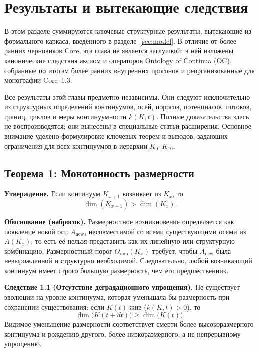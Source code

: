 \section{Результаты и вытекающие следствия}
\label{sec:results}

В этом разделе суммируются ключевые структурные результаты, вытекающие из формального каркаса, введённого в разделе~\ref{sec:model}.
В отличие от более ранних черновиков Core, эта глава не является заглушкой: в ней изложены канонические следствия аксиом и операторов Ontology of Continua (OC), собранные по итогам более ранних внутренних прогонов и реорганизованные для монографии Core~1.3.

Все результаты этой главы предметно-независимы.
Они следуют исключительно из структурных определений континуумов, осей, порогов, потенциалов, потоков, границ, циклов и меры континуумности \(k(K,t)\).
Полные доказательства здесь не воспроизводятся; они вынесены в специальные статьи-расширения.
Основное внимание уделено формулировке ключевых теорем и выводов, задающих ограничения для всех континуумов в иерархии \(K_0\)–\(K_{10}\).

\subsection{Теорема 1: Монотонность размерности}

\textbf{Утверждение.}
Если континуум \(K_{x+1}\) возникает из \(K_x\), то
\[
    \dim(K_{x+1}) > \dim(K_x).
\]

\textbf{Обоснование (набросок).}
Размерностное возникновение определяется как появление новой оси \(A_{\mathrm{new}}\), несовместимой со всеми существующими осями из \(A(K_x)\); то есть её нельзя представить как их линейную или структурную комбинацию.
Размерностный порог \(\Theta_{\mathrm{dim}}(K_x)\) требует, чтобы \(A_{\mathrm{new}}\) была невырожденной и структурно необходимой.
Следовательно, любой возникающий континуум имеет строго большую размерность, чем его предшественник.

\textbf{Следствие 1.1 (Отсутствие деградационного упрощения).}
Не существует эволюции на уровне континуума, которая уменьшала бы размерность при сохранении существования:
если \(K(t)\) жив (\(k(K,t) > 0\)), то
\[
    \dim\big(K(t+dt)\big) \ge \dim\big(K(t)\big).
\]
Видимое уменьшение размерности соответствует смерти более высокоразмерного континуума и рождению другого, более низкоразмерного, а не непрерывному упрощению.

